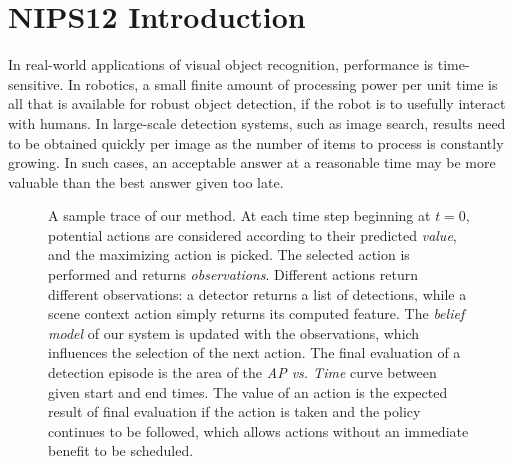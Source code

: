 \section{NIPS12 Introduction} \label{sec:nips12_introduction}

In real-world applications of visual object recognition, performance is time-sensitive.
In robotics, a small finite amount of processing power per unit time is all that is available for robust object detection, if the robot is to usefully interact with humans.
In large-scale detection systems, such as image search, results need to be obtained quickly per image as the number of items to process is constantly growing.
In such cases, an acceptable answer at a reasonable time may be more valuable than the best answer given too late.

\begin{figure}[ht!]
  \caption{
A sample trace of our method.
At each time step beginning at $t=0$, potential actions are considered according to their predicted \emph{value}, and the maximizing action is picked.
The selected action is performed and returns \emph{observations}.
Different actions return different observations: a detector returns a list of detections, while a scene context action simply returns its computed feature.
The \emph{belief model} of our system is updated with the observations, which influences the selection of the next action.
The final evaluation of a detection episode is the area of the \emph{AP vs. Time} curve between given start and end times.
The value of an action is the expected result of final evaluation if the action is taken and the policy continues to be followed, which allows actions without an immediate benefit to be scheduled.
}
  \label{fig:figure1}
\end{figure}

